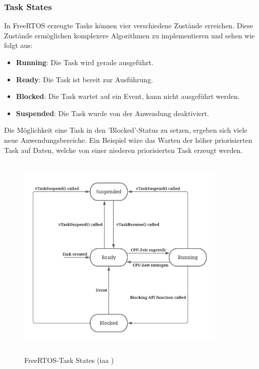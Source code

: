 \documentclass[../EDF Master Thesis.tex]{subfiles}
\begin{document}
\clearpage

\subsubsection{Task States} \label{section:task_states}
In FreeRTOS erzeugte Tasks können vier verschiedene Zustände erreichen.
Diese Zustände ermöglichen komplexere Algorithmen zu implementieren und sehen wie folgt aus:

\begin{itemize}
    \item \textbf{Running}: Die Task wird gerade ausgeführt.
    \item \textbf{Ready}: Die Task ist bereit zur Ausführung.
    \item \textbf{Blocked}: Die Task wartet auf ein Event, kann nicht ausgeführt werden.
    \item \textbf{Suspended}: Die Task wurde von der Anwendung deaktiviert.
\end{itemize}
\begin{center}
    \parencite{freertos-task-states}
\end{center}

Die Möglichkeit eine Task in den 'Blocked'-Status zu setzen, ergeben sich viele neue Anwendungsbereiche.
Ein Beispiel wäre das Warten der höher priorisierten Task auf Daten, welche von einer niederen priorisierten Task erzeugt werden.

\begin{figure}[H]
    \centering
    \includegraphics[height=10cm, width=10cm]{./attachments/FreeRTOS_Task_States.pdf}
    \caption[FreeRTOS Task States]{FreeRTOS-Task States (\ac{iaa} \cite{freertos-task-states})}
    \label{fig:FreeRTOS_Task_States}
\end{figure}
\end{document}
